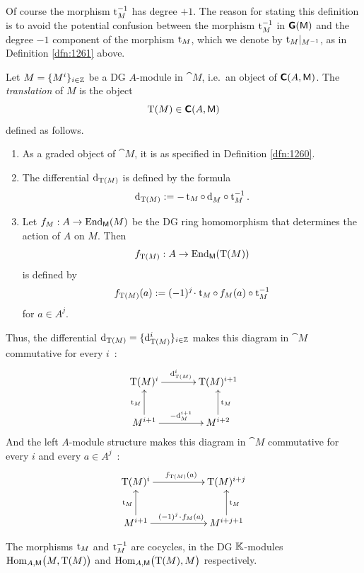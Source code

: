 Of course the morphism $\operatorname{t}_M^{-1}$ has degree $+1$. The reason for stating 
this definition is to avoid the potential confusion between the morphism 
$\operatorname{t}_M^{-1}$ in $\boldsymbol{\mathsf{G}}(\operatorname{\mathsf{M}})$ and the degree $-1$ component of the 
morphism $\operatorname{t}_M$, which we denote by ${\operatorname{t}_M}|_{M^{-1}}$, as in 
Definition \ref{dfn:1261} above. 

\begin{dfn} \label{dfn:1170}
Let $M = \{ M^i \}_{i \in \mathbb{Z}}$ be a DG $A$-module in $\cat{M}$, i.e.\ an 
object of $\boldsymbol{\mathsf{C}}(A, \operatorname{\mathsf{M}})$.
The {\em translation} of $M$ 
is the object 
\[ \operatorname{T}(M) \in \boldsymbol{\mathsf{C}}(A, \operatorname{\mathsf{M}}) \]
defined as follows. 
\begin{enumerate}
\item As a graded object of $\cat{M}$, it is as specified in 
Definition \ref{dfn:1260}. 

\item The differential $\mathrm{d}_{\operatorname{T}(M)}$
is defined by the formula
\[ \mathrm{d}_{\operatorname{T}(M)} := - \operatorname{t}_M \circ \, \mathrm{d}_M^{} \circ 
\operatorname{t}_M^{-1} . \]

\item Let $f_M : A \to \operatorname{End}_{\operatorname{\mathsf{M}}}(M)$ be the DG ring homomorphism that 
determines the action of $A$ on $M$. Then 
\[ f_{ \operatorname{T}(M)} : A \to \operatorname{End}_{\operatorname{\mathsf{M}}}(\operatorname{T}(M)) \]
is defined by
\[ f_{ \operatorname{T}(M)}(a) := (-1)^{ j} \mspace{1.5mu}{\cdot}\mspace{1.5mu} 
\operatorname{t}_M \circ \, f_{M}(a) \circ \operatorname{t}_M^{-1} \]
for $a \in A^j$.
\end{enumerate}
\end{dfn}

Thus, the differential 
$\mathrm{d}_{ \operatorname{T}(M)}  = \{ \mathrm{d}_{ \operatorname{T}(M)}^i \}_{i \in \mathbb{Z}}$ makes this 
diagram in $\cat{M}$ commutative for every $i$~: 
\[ \UseTips  \xymatrix @C=8ex @R=6ex {
\opn{T}(M)^i 
\ar[r]^{\d_{\lms \opn{T}(M)}^i}
&
\opn{T}(M)^{i + 1}
\\
M^{i + 1}
\ar[u]^{\opn{t}_M}
\ar[r]^{- \d_M^{i + 1}}
&
M^{i + 2}
\ar[u]_{\opn{t}_M}
} \]
And the left $A$-module structure makes this diagram in $\cat{M}$ 
commutative for every $i$ and every $a \in A^j$~:
\[ \UseTips  \xymatrix @C=12ex @R=6ex {
\opn{T}(M)^i 
\ar[r]^{f_{\lms \opn{T}(M)}(a)}
&
\opn{T}(M)^{i + j}
\\
M^{i + 1}
\ar[u]^{\opn{t}_M}
\ar[r]^{ (-1)^{\lms j} \cd f_{\lms M}(a)}
&
M^{i + j + 1}
\ar[u]_{\opn{t}_M}
} \]

\begin{prop}  \label{prop:1176}
The morphisms $\operatorname{t}_M$ and $\operatorname{t}_M^{-1}$ are cocycles, in the DG 
$\mathbb{K}$-modules 
$\operatorname{Hom}_{A, \operatorname{\mathsf{M}}} \bigl( M, \operatorname{T}(M) \bigr)$ and 
$\operatorname{Hom}_{A, \operatorname{\mathsf{M}}} \bigl( \operatorname{T}(M), M \bigr)$
respectively.
\end{prop}

